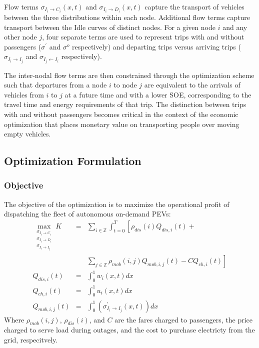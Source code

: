 \documentclass[journal]{IEEEtran}
\begin{document}
Flow terms $\sigma_{I_i \rightarrow C_i}(x,t)$ and $\sigma_{I_i \rightarrow D_i}(x,t)$ capture the transport of vehicles between the three distributions within each node. Additional flow terms capture transport between the Idle curves of distinct nodes. For a given node $i$ and any other node $j$, four separate terms are used to represent trips with and without passengers ($\sigma^\prime$ and $\sigma^o$ respectively) and departing trips versus arriving trips ($\sigma_{I_i \rightarrow I_j}$ and $\sigma_{I_j \leftarrow I_i}$ respectively).

The inter-nodal flow terms are then constrained through the optimization scheme such that departures from a node $i$ to node $j$ are equivalent to the arrivals of vehicles from $i$ to $j$ at a future time and with a lower SOE, corresponding to the travel time and energy requirements of that trip. The distinction between trips with and without passengers becomes critical in the context of the economic optimization that places monetary value on transporting people over moving empty vehicles.

\subsection{Optimization Formulation}

\subsubsection{Objective}
The objective of the optimization is to maximize the operational profit of dispatching the fleet of autonomous on-demand PEVs:
\begin{eqnarray*}
  \max_{\substack{\sigma_{I_i \rightarrow C_i} \\
    \sigma_{I_i \rightarrow D_i} \\ 
    \sigma_{I_i \rightarrow I_j}}}
    K &=& \sum_{i\in\mathbb{Z}} \int_{t=0}^{T} \left[ \rho_{dis}(i) Q_{dis,i}(t) + \right. \\ 
      && \left. \sum_{j\in\mathbb{Z}}\rho_{mob}(i,j)Q_{mob,i,j}(t)  - CQ_{ch,i}(t) \right]\\
    Q_{dis,i}(t) & = & \int_{0}^{1} w_i(x,t) dx \\
    Q_{ch,i}(t) & = & \int_{0}^{1} u_i(x,t) dx \\
    Q_{mob,i,j}(t) & = & \int_{0}^{1}\left( \sigma_{I_i \rightarrow I_j}^\prime(x,t) \right)dx
\end{eqnarray*}
Where $\rho_{mob}(i,j)$, $\rho_{dis}(i)$, and $C$ are the fares charged to passengers, the price charged to serve load during outages, and the cost to purchase electricty from the grid, respecitvely.
\end{document}
